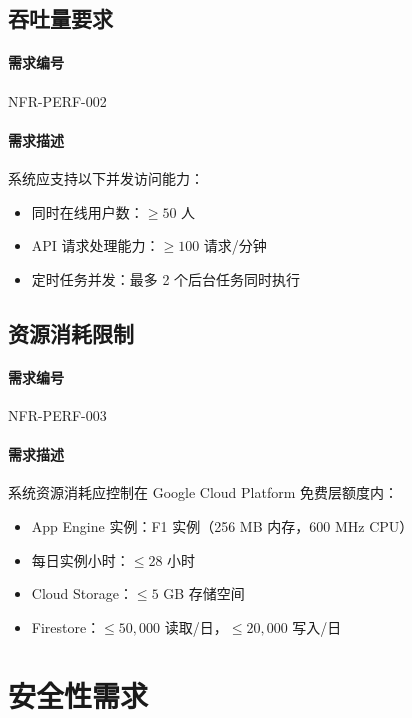 \subsection{吞吐量要求}

\paragraph{需求编号} NFR-PERF-002

\paragraph{需求描述} 系统应支持以下并发访问能力：

\begin{itemize}
    \item 同时在线用户数：$\geq 50$ 人
    \item API 请求处理能力：$\geq 100$ 请求/分钟
    \item 定时任务并发：最多 2 个后台任务同时执行
\end{itemize}

\subsection{资源消耗限制}

\paragraph{需求编号} NFR-PERF-003

\paragraph{需求描述} 系统资源消耗应控制在 Google Cloud Platform 免费层额度内：

\begin{itemize}
    \item App Engine 实例：F1 实例（256 MB 内存，600 MHz CPU）
    \item 每日实例小时：$\leq 28$ 小时
    \item Cloud Storage：$\leq 5$ GB 存储空间
    \item Firestore：$\leq 50,000$ 读取/日，$\leq 20,000$ 写入/日
\end{itemize}

\section{安全性需求}

